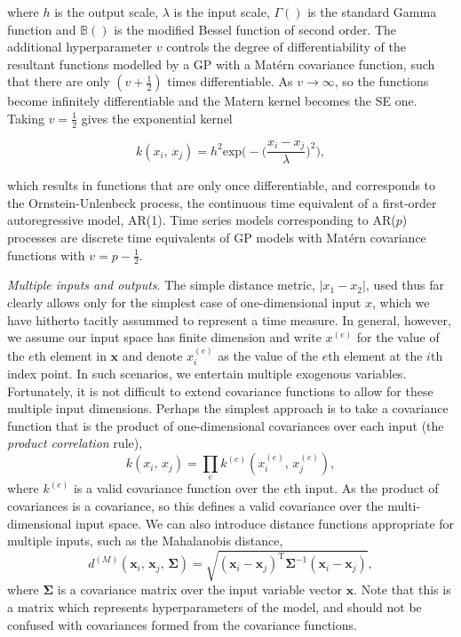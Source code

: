          where \(h\) is the output scale, \(\lambda\) is the input scale, \(\Gamma()\) is the standard Gamma function and \(\mathbb{B}()\) is the modified Bessel function of second order. The additional hyperparameter \(v\) controls the degree of differentiability of the resultant functions modelled by a GP with a Mat\'ern covariance function, such that there are only \((v + \frac{1}{2})\) times differentiable. As \(v \to \infty\), so the functions become infinitely differentiable and the Matern kernel becomes the SE one. Taking \(v = \frac{1}{2}\) gives the exponential kernel

         \[k(x_{i}, \, x_{j}) = h^{2} \text{exp} \bigg(- \Big(\frac{x_i - x_j}{\lambda} \Big)^2 \bigg),\]

         which results in functions that are only once differentiable, and corresponds to the Ornstein-Unlenbeck process, the continuous time equivalent of a first-order autoregressive model, AR(1). Time series models corresponding to AR(\(p\)) processes are discrete time equivalents of GP models with Mat\'ern covariance functions with \(v = p - \frac{1}{2}\).

         \vspace{1em}

         \textit{Multiple inputs and outputs}. The simple distance metric, \(|x_{1} - x_{2}|\), used thus far clearly allows only for the simplest case of one-dimensional input \(x\), which we have hitherto tacitly assummed to represent a time measure. In general, however, we assume our input space has finite dimension and write \(x^{(e)}\) for the value of the \(e\)th element in \(\mathbf{x}\) and denote \(x_{i}^{(e)}\) as the value of the \(e\)th element at the \(i\)th index point. In such scenarios, we entertain multiple exogenous variables. Fortunately, it is not difficult to extend covariance functions to allow for these multiple input dimensions. Perhaps the simplest approach is to take a covariance function that is the product of one-dimensional covariances over each input (the \textit{product correlation} rule), \[k(x_{i}, \, x_{j}) = \prod_{e} k^{(e)} (x_{i}^{(e)}, \, x_{j}^{(e)}),\]
         where \(k^{(e)}\) is a valid covariance function over the \(e\)th input. As the product of covariances is a covariance, so this defines a valid covariance over the multi-dimensional input space. We can also introduce distance functions appropriate for multiple inputs, such as the Mahalanobis distance, \[d^{(M)}(\mathbf{x}_{i}, \, \mathbf{x}_{j}, \, \boldsymbol{\Sigma}) = \sqrt{(\mathbf{x}_{i} - \mathbf{x}_{j})^{\text{T}} \boldsymbol{\Sigma}^{-1} (\mathbf{x}_{i} - \mathbf{x}_{j})},\]
         where \(\boldsymbol{\Sigma}\) is a covariance matrix over the input variable vector \(\mathbf{x}\). Note that this is a matrix which represents hyperparameters of the model, and should not be confused with covariances formed from the covariance functions.

